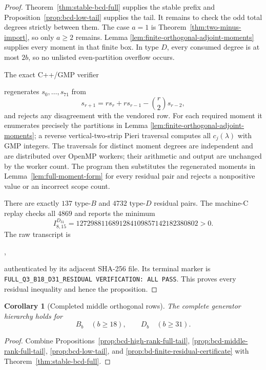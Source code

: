 \documentclass[11pt,reqno]{amsart}
\theoremstyle{plain}
\newtheorem{corollary}[theorem]{Corollary}
\theoremstyle{definition}
\begin{document}
\begin{proof}
Theorem~\ref{thm:stable-bcd-full} supplies the stable prefix and
Proposition~\ref{prop:bcd-low-tail} supplies the tail.  It remains to check
the odd total degrees strictly between them.  The case $a=1$ is
Theorem~\ref{thm:two-minus-import}, so only $a\geq2$ remains.  Lemma
\ref{lem:finite-orthogonal-adjoint-moments} supplies every moment in that
finite box.  In type $D$, every consumed degree is at most $2b$, so no
unlisted even-partition overflow occurs.

The exact C++/GMP verifier
\begin{center}
\end{center}
regenerates $s_0,\ldots,s_{71}$ from
\[
 s_{r+1}=r s_r+r s_{r-1}-\binom r2s_{r-2},
\]
and rejects any disagreement with the vendored row.  For each required
moment it enumerates precisely the partitions in Lemma
\ref{lem:finite-orthogonal-adjoint-moments}; a reverse
vertical-two-strip Pieri traversal computes all $c_j(\lambda)$ with GMP
integers.  The traversals for distinct moment degrees are independent and
are distributed over OpenMP workers; their arithmetic and output are
unchanged by the worker count.  The program then substitutes the regenerated
moments in Lemma~\ref{lem:full-moment-form} for every residual pair and
rejects a nonpositive value or an incorrect scope count.

There are exactly $137$ type-$B$ and $4732$ type-$D$ residual pairs.  The
machine-C replay checks all $4869$ and reports the minimum
\[
 I^{D_{31}}_{8,15}
 =1272988116891284109857142182380802>0.
\]
The raw transcript is
\begin{center}
,
\end{center}
authenticated by its adjacent SHA-256 file.  Its terminal marker is
\texttt{FULL\_Q3\_B18\_D31\_RESIDUAL VERIFICATION: ALL PASS}.
This proves every residual inequality and hence the proposition.
\end{proof}

\begin{corollary}[Completed middle orthogonal rows]
\label{cor:completed-middle-orthogonal-rows}
The complete generator hierarchy holds for
\[
 B_b\quad(b\geq18),\qquad D_b\quad(b\geq31).
\]
\end{corollary}

\begin{proof}
Combine Propositions~\ref{prop:bcd-high-rank-full-tail},
\ref{prop:bcd-middle-rank-full-tail},
\ref{prop:bcd-low-tail}, and
\ref{prop:bd-finite-residual-certificate} with
Theorem~\ref{thm:stable-bcd-full}.
\end{proof}
\end{document}
